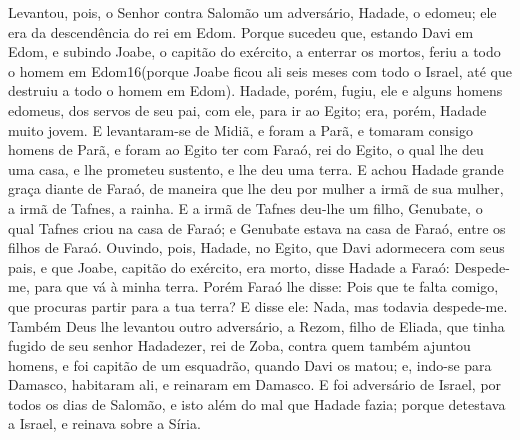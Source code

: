 Levantou, pois, o Senhor contra Salomão um adversário, Hadade, o
edomeu; ele era da descendência do rei em Edom. Porque
sucedeu que, estando Davi em Edom, e subindo Joabe, o capitão do
exército, a enterrar os mortos, feriu a todo o homem em
Edom16(porque Joabe ficou ali seis meses com todo o Israel, até que
destruiu a todo o homem em Edom). Hadade, porém, fugiu, ele e
alguns homens edomeus, dos servos de seu pai, com ele, para ir ao
Egito; era, porém, Hadade muito jovem. E levantaram-se de
Midiã, e foram a Parã, e tomaram consigo homens de Parã, e foram ao
Egito ter com Faraó, rei do Egito, o qual lhe deu uma casa, e lhe
prometeu sustento, e lhe deu uma terra. E achou Hadade grande
graça diante de Faraó, de maneira que lhe deu por mulher a irmã de
sua mulher, a irmã de Tafnes, a rainha. E a irmã de Tafnes
deu-lhe um filho, Genubate, o qual Tafnes criou na casa de Faraó; e
Genubate estava na casa de Faraó, entre os filhos de Faraó.
Ouvindo, pois, Hadade, no Egito, que Davi adormecera com seus
pais, e que Joabe, capitão do exército, era morto, disse Hadade a
Faraó: Despede-me, para que vá à minha terra. Porém Faraó lhe
disse: Pois que te falta comigo, que procuras partir para a tua
terra? E disse ele: Nada, mas todavia despede-me. Também Deus
lhe levantou outro adversário, a Rezom, filho de Eliada, que tinha
fugido de seu senhor Hadadezer, rei de Zoba, contra quem
também ajuntou homens, e foi capitão de um esquadrão, quando Davi os
matou; e, indo-se para Damasco, habitaram ali, e reinaram em
Damasco. E foi adversário de Israel, por todos os dias de
Salomão, e isto além do mal que Hadade fazia; porque detestava a
Israel, e reinava sobre a Síria.

